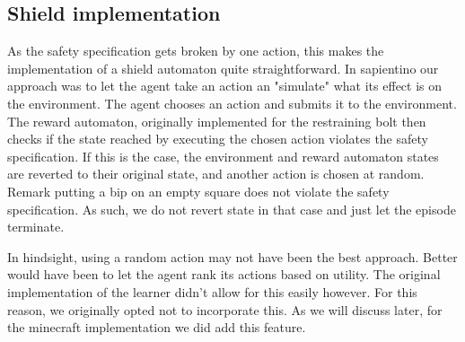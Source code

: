 \documentclass[letterpaper]{article}
\begin{document}
\subsection{Shield implementation}
As the safety specification gets broken by one action, this makes the implementation of a shield automaton quite straightforward. In sapientino our approach was to let the agent take an action an "simulate" what its effect is on the environment. The agent chooses an action and submits it to the environment. The reward automaton, originally implemented for the restraining bolt then checks if the state reached by executing the chosen action violates the safety specification. If this is the case, the environment and reward automaton states are reverted to their original state, and another action is chosen at random. Remark putting a bip on an empty square does not violate the safety specification. As such, we do not revert state in that case and just let the episode terminate.
\par In hindsight, using a random action may not have been the best approach. Better would have been to let the agent rank its actions based on utility. The original implementation of the learner didn't allow for this easily however. For this reason, we originally opted not to incorporate this. As we will discuss later, for the minecraft implementation we did add this feature.
\end{document}
